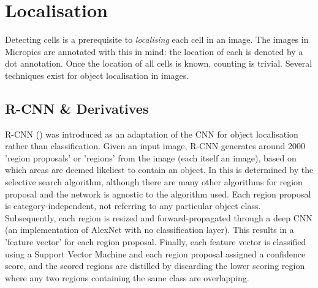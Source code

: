 
\section{Localisation}
Detecting cells is a prerequisite to \textit{localising} each cell in an image. The images in Micropics are annotated with this in mind: the location of each is denoted by a dot annotation. Once the location of all cells is known, counting is trivial. Several techniques exist for object localisation in images.

\subsection{R-CNN \& Derivatives}
R-CNN (\cite{girshick2014rich}) was introduced as an adaptation of the CNN for object localisation rather than classification. Given an input image, R-CNN generates around 2000 'region proposals' or 'regions' from the image (each itself an image), based on which areas are deemed likeliest to contain an object. In \cite{girshick2014rich} this is determined by the selective search algorithm, although there are many other algorithms for region proposal and the network is agnostic to the algorithm used. Each region proposal is category-independent, not referring to any particular object class. Subsequently, each region is resized and forward-propagated through a deep CNN (an implementation of AlexNet with no classification layer). This results in a 'feature vector' for each region proposal. Finally, each feature vector is classified using a Support Vector Machine and each region proposal assigned a confidence score, and the scored regions are distilled by discarding the lower scoring region where any two regions containing the same class are overlapping.\\

